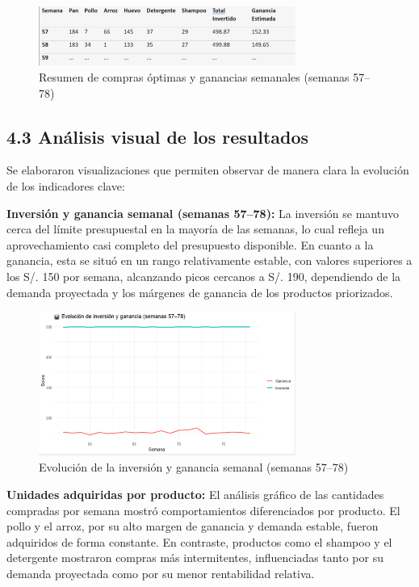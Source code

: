 \documentclass[12pt]{article}
\begin{document}
\begin{figure}[H]
    \centering
    \includegraphics[width=0.75\textwidth]{tablaPRED.png}
    \caption{Resumen de compras óptimas y ganancias semanales (semanas 57–78)}
\end{figure}

\subsection*{4.3 Análisis visual de los resultados}

Se elaboraron visualizaciones que permiten observar de manera clara la evolución de los indicadores clave:

\textbf{Inversión y ganancia semanal (semanas 57–78):} La inversión se mantuvo cerca del límite presupuestal en la mayoría de las semanas, lo cual refleja un aprovechamiento casi completo del presupuesto disponible. En cuanto a la ganancia, esta se situó en un rango relativamente estable, con valores superiores a los S/. 150 por semana, alcanzando picos cercanos a S/. 190, dependiendo de la demanda proyectada y los márgenes de ganancia de los productos priorizados.

\begin{figure}[H]
    \centering
    \includegraphics[width=0.75\textwidth]{Imagen3.png}
    \caption{Evolución de la inversión y ganancia semanal (semanas 57–78)}
\end{figure}

\textbf{Unidades adquiridas por producto:} El análisis gráfico de las cantidades compradas por semana mostró comportamientos diferenciados por producto. El pollo y el arroz, por su alto margen de ganancia y demanda estable, fueron adquiridos de forma constante. En contraste, productos como el shampoo y el detergente mostraron compras más intermitentes, influenciadas tanto por su demanda proyectada como por su menor rentabilidad relativa.
\end{document}
